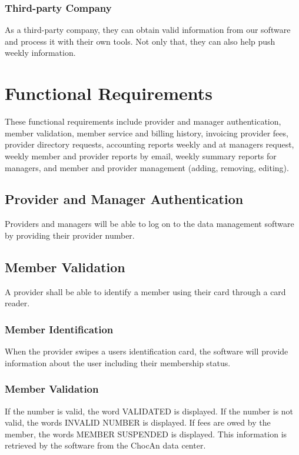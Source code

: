 \documentclass{article}
\begin{document}
\subsubsection{Third-party Company}
As a third-party company, they can obtain valid information from our software and process it with their own tools. Not only that, they can also help push weekly information.




\section{Functional Requirements}
These functional requirements include provider and manager authentication, member validation, member service and billing history, invoicing provider fees, provider directory requests, accounting reports weekly and at managers request, weekly member and provider reports by email, weekly summary reports for managers, and member and provider management (adding, removing, editing). 

\subsection{Provider and Manager Authentication}
Providers and managers will be able to log on to the data management software by providing their provider number.

\subsection{Member Validation}
A provider shall be able to identify a member using their card through a card reader. 
\subsubsection{Member Identification}
When the provider swipes a users identification card, the software will provide information about the user including their membership status.
\subsubsection{Member Validation}
If the number is valid, the word VALIDATED is displayed.
If the number is not valid, the words INVALID NUMBER is displayed.
If fees are owed by the member, the words MEMBER SUSPENDED is displayed.
This information is retrieved by the software from the ChocAn data center.
\end{document}
